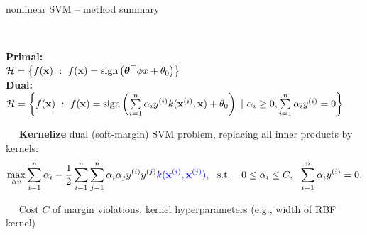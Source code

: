 \begin{frame2}{nonlinear SVM -- method summary}

 ~~

\textbf{Primal:}\\
$\Hspace  = \left \{\fx ~:~ \fx = \sign \left( \thetav^\top \phi x + \theta_0 \right) \right \}$\\
\textbf{Dual:}\\
$\Hspace  = \left \{\fx ~:~ \fx = \sign \left( \sumin \alpha_i \yi k(\xi, \xv) + \theta_0 \right) ~|~ \alpha_i \geq 0,  \sumin \alpha_i \yi = 0 \right \}$ %

 ~~ \textbf{Kernelize} dual (soft-margin) SVM problem, 
replacing all inner products by kernels:
$$\max_{\alpha v} \sumin \alpha_i - \frac{1}{2}\sumin \sumjn
\alpha_i\alpha_j\yi y^{(j)} \textcolor{blue}{k(\xi, \xi[j])}, ~~ \text{s.t. } ~~ 
0 \le \alpha_i \le C, ~~ \sumin \alpha_i \yi = 0.
$$



 ~~ Cost $C$ of margin violations, kernel 
hyperparameters (e.g., width of RBF kernel)

\end{frame2}

